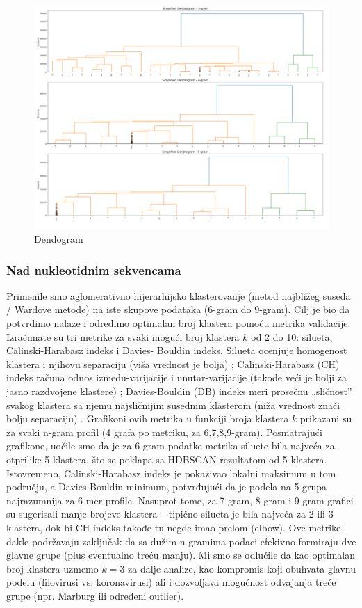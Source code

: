 \documentclass[a4paper,12pt]{article}
\begin{document}
\begin{figure}[h!]
    \centering
    \includegraphics[width=1\textwidth]{images/hcdenaa.png}
    \caption{Dendogram}
    \label{fig:hc_dend}
\end{figure}

\newpage
\subsubsection{Nad nukleotidnim sekvencama}


Primenile smo aglomerativno hijerarhijsko
klasterovanje (metod najbližeg suseda / Wardove metode) na iste skupove podataka (6-gram do 9-gram).
Cilj je bio da potvrdimo nalaze i odredimo optimalan broj klastera pomoću metrika validacije. Izračunate su
tri metrike za svaki mogući broj klastera $k$ od 2 do 10: silueta, Calinski-Harabasz indeks i Davies-
Bouldin indeks. Silueta ocenjuje homogenost klastera i njihovu separaciju (viša vrednost je bolja) ; Calinski-Harabasz (CH) indeks računa odnos između-varijacije i unutar-varijacije (takođe veći je bolji za jasno
razdvojene klastere) ; Davies-Bouldin (DB) indeks meri prosečnu „sličnost” svakog klastera sa njemu
najsličnijim susednim klasterom (niža vrednost znači bolju separaciju) . Grafikoni ovih metrika u funkciji
broja klastera $k$ prikazani su za svaki n-gram profil (4 grafa po metriku, za 6,7,8,9-gram). Posmatrajući
grafikone, uočile smo da je za 6-gram podatke metrika siluete bila najveća za otprilike 5 klastera, što se
poklapa sa HDBSCAN rezultatom od 5 klastera. Istovremeno, Calinski-Harabasz indeks je pokazivao lokalni
maksimum u tom području, a Davies-Bouldin minimum, potvrđujući da je podela na 5 grupa najrazumnija
za 6-mer profile. Nasuprot tome, za 7-gram, 8-gram i 9-gram grafici su sugerisali manje brojeve klastera –
tipično silueta je bila najveća za 2 ili 3 klastera, dok bi CH indeks takođe tu negde imao prelom (elbow). Ove
metrike dakle podržavaju zaključak da sa dužim n-gramima podaci efekivno formiraju dve glavne grupe
(plus eventualno treću manju). Mi smo se odlučile da kao optimalan broj klastera uzmemo $k=3$ za dalje
analize, kao kompromis koji obuhvata glavnu podelu (filovirusi vs. koronavirusi) ali i dozvoljava mogućnost
odvajanja treće grupe (npr. Marburg ili određeni outlier).
\end{document}
